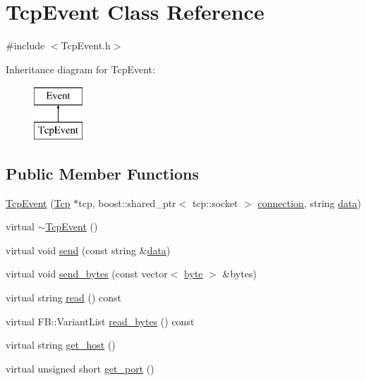 \hypertarget{classTcpEvent}{
\section{TcpEvent Class Reference}
\label{classTcpEvent}
}


{\ttfamily \#include $<$TcpEvent.h$>$}

Inheritance diagram for TcpEvent:\begin{figure}[H]
\begin{center}
\leavevmode
\includegraphics[height=2.000000cm]{classTcpEvent}
\end{center}
\end{figure}
\subsection*{Public Member Functions}
\begin{DoxyCompactItemize}
\item 
\hyperlink{classTcpEvent_a83e2a8e7a05da24e41bfd957f6699959}{TcpEvent} (\hyperlink{classTcp}{Tcp} $\ast$tcp, boost::shared\_\-ptr$<$ tcp::socket $>$ \hyperlink{classTcpEvent_a0cb428ee778cb7c867360b13617011c8}{connection}, string \hyperlink{classTcpEvent_ade7277f4c6339286ea9551183630ee4c}{data})
\item 
virtual \hyperlink{classTcpEvent_a43d6c207a513f1e0e9b917df277a248b}{$\sim$TcpEvent} ()
\item 
virtual void \hyperlink{classTcpEvent_ac9e73ac6ebadc8712d3edfec5e4b1dc9}{send} (const string \&\hyperlink{classTcpEvent_ade7277f4c6339286ea9551183630ee4c}{data})
\item 
virtual void \hyperlink{classTcpEvent_ab6741ad9135b421c220e7601939ea925}{send\_\-bytes} (const vector$<$ \hyperlink{Event_8h_ae0aa21f6bcb621fe36c2c962aa0452fe}{byte} $>$ \&bytes)
\item 
virtual string \hyperlink{classTcpEvent_abc8541d2f0e5b0fbf15191392fbb4a20}{read} () const 
\item 
virtual FB::VariantList \hyperlink{classTcpEvent_adcbbf4231886db58d1df95357b249a26}{read\_\-bytes} () const 
\item 
virtual string \hyperlink{classTcpEvent_a47be6347ecf372f3fbf934ba489d90c1}{get\_\-host} ()
\item 
virtual unsigned short \hyperlink{classTcpEvent_aa14fbf8c465c3487e7eae02ec8815093}{get\_\-port} ()
\end{DoxyCompactItemize}
